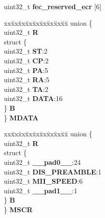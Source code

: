 \begin{DoxyCompactItemize}
\begin{tabbing}
\end{tabbing}\item 
\mbox{\label{structFEC__tag_abe61c7890097893dd9b5f2f2c66d3840}} 
uint32\+\_\+t {\bfseries fec\+\_\+reserved\+\_\+ecr} \mbox{[}6\mbox{]}
\item 
\mbox{\label{structFEC__tag_ab01e697e6b28a3599a4ef0b543bacd0a}} 
\begin{tabbing}
xx\=xx\=xx\=xx\=xx\=xx\=xx\=xx\=xx\=\kill
union \{\\
\>uint32\_t {\bfseries R}\\
\>struct \{\\
\>\>uint32\_t {\bfseries ST}:2\\
\>\>uint32\_t {\bfseries CP}:2\\
\>\>uint32\_t {\bfseries PA}:5\\
\>\>uint32\_t {\bfseries RA}:5\\
\>\>uint32\_t {\bfseries TA}:2\\
\>\>uint32\_t {\bfseries DATA}:16\\
\>\} {\bfseries B}\\
\} {\bfseries MDATA}\\

\end{tabbing}\item 
\mbox{\label{structFEC__tag_adf1ef56078d8bcbf8ca3eca5b46baed3}} 
\begin{tabbing}
xx\=xx\=xx\=xx\=xx\=xx\=xx\=xx\=xx\=\kill
union \{\\
\>uint32\_t {\bfseries R}\\
\>struct \{\\
\>\>uint32\_t {\bfseries \_\_pad0\_\_}:24\\
\>\>uint32\_t {\bfseries DIS\_PREAMBLE}:1\\
\>\>uint32\_t {\bfseries MII\_SPEED}:6\\
\>\>uint32\_t {\bfseries \_\_pad1\_\_}:1\\
\>\} {\bfseries B}\\
\} {\bfseries MSCR}\\


\end{tabbing}
\end{DoxyCompactItemize}
